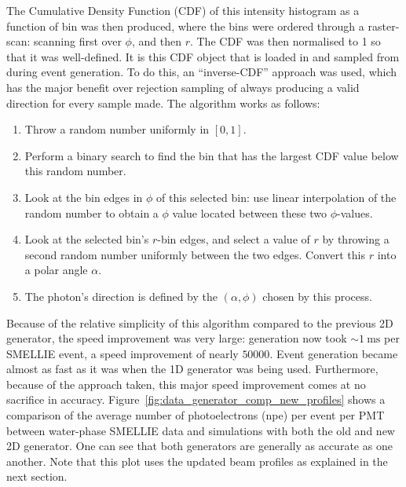 The Cumulative Density Function (CDF) of this intensity histogram as a function of bin was then produced, where the bins were ordered through a raster-scan: scanning first over $\phi$, and then $r$. The CDF was then normalised to 1 so that it was well-defined. It is this CDF object that is loaded in and sampled from during event generation. To do this, an ``inverse-CDF'' approach was used, which has the major benefit over rejection sampling of always producing a valid direction for every sample made. The algorithm works as follows:

\begin{enumerate}
    \item Throw a random number uniformly in $[0,1]$.
    \item Perform a binary search to find the bin that has the largest CDF value below this random number.
    \item Look at the bin edges in $\phi$ of this selected bin: use linear interpolation of the random number to obtain a $\phi$ value located between these two $\phi$-values.
    \item Look at the selected bin's $r$-bin edges, and select a value of $r$ by throwing a second random number uniformly between the two edges. Convert this $r$ into a polar angle $\alpha$.
    \item The photon's direction is defined by the $(\alpha, \phi)$ chosen by this process. 
\end{enumerate}

Because of the relative simplicity of this algorithm compared to the previous 2D generator, the speed improvement was very large: generation now took $\sim\SI{1}{\milli\second}$ per SMELLIE event, a speed improvement of nearly $\num{50000}$. Event generation became almost as fast as it was when the 1D generator was being used. Furthermore, because of the approach taken, this major speed improvement comes at no sacrifice in accuracy. Figure~\ref{fig:data_generator_comp_new_profiles} shows a comparison of the average number of photoelectrons (npe) per event per PMT between water-phase SMELLIE data and simulations with both the old and new 2D generator. One can see that both generators are generally as accurate as one another. Note that this plot uses the updated beam profiles as explained in the next section.

